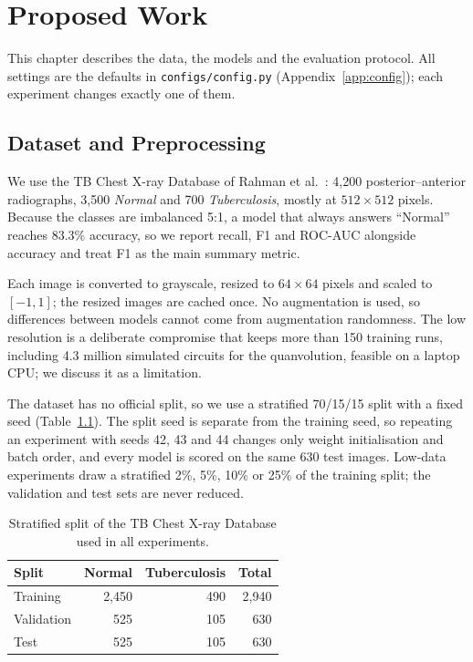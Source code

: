 \chapter{Proposed Work}
\label{ch:proposed}

This chapter describes the data, the models and the evaluation protocol.
All settings are the defaults in \texttt{configs/config.py}
(Appendix~\ref{app:config}); each experiment changes exactly one of them.

\section{Dataset and Preprocessing}
\label{sec:dataset}
We use the TB Chest X-ray Database of Rahman et al.~\cite{rahman2020}: 4,200
posterior--anterior radiographs, 3,500 \emph{Normal} and 700
\emph{Tuberculosis}, mostly at $512 \times 512$ pixels. Because the classes
are imbalanced 5:1, a model that always answers ``Normal'' reaches 83.3\%
accuracy, so we report recall, F1 and ROC-AUC alongside accuracy and treat
F1 as the main summary metric.

Each image is converted to grayscale, resized to $64 \times 64$ pixels and
scaled to $[-1, 1]$; the resized images are cached once. No augmentation is
used, so differences between models cannot come from augmentation
randomness. The low resolution is a deliberate compromise that keeps more
than 150 training runs, including 4.3 million simulated circuits for the
quanvolution, feasible on a laptop CPU; we discuss it as a limitation.

The dataset has no official split, so we use a stratified 70/15/15 split
with a fixed seed (Table~\ref{tab:split}). The split seed is separate from
the training seed, so repeating an experiment with seeds 42, 43 and 44
changes only weight initialisation and batch order, and every model is
scored on the same 630 test images. Low-data experiments draw a stratified
2\%, 5\%, 10\% or 25\% of the training split; the validation and test sets
are never reduced.

\begin{table}[htbp]
\centering
\caption{Stratified split of the TB Chest X-ray Database used in all experiments.}
\label{tab:split}
\begin{tabular}{lrrr}
\toprule
Split & Normal & Tuberculosis & Total \\
\midrule
Training   & 2,450 & 490 & 2,940 \\
Validation &   525 & 105 &   630 \\
Test       &   525 & 105 &   630 \\
\bottomrule
\end{tabular}
\end{table}


